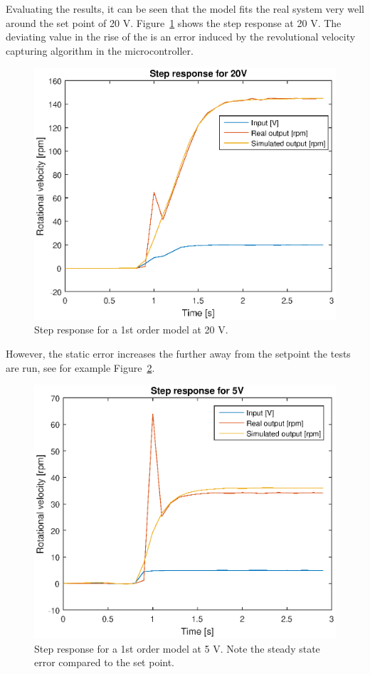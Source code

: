 Evaluating the results, it can be seen that the model fits the real system very
well around the set point of 20 V. Figure~\ref{fig:1storder_20} shows the step
response at 20 V. The deviating value in the rise of the is an error induced by
the revolutional velocity capturing algorithm in the microcontroller.
\begin{figure}[H]
    \centering
    \includegraphics[width=\textwidth]{./img/testrig_20Vstep_no_i_no_fric.eps}
    \caption{Step response for a 1st order model at 20 V.}\label{fig:1storder_20}
\end{figure}
However, the static error increases the further away from the setpoint the tests
are run, see for example Figure~\ref{fig:1storder_5}.
\begin{figure}[H]
    \centering
    \includegraphics[width=\textwidth]{./img/testrig_5Vstep_no_i_no_fric.eps}
    \caption{Step response for a 1st order model at 5 V. Note the steady state
    error compared to the set point.}\label{fig:1storder_5}
\end{figure}

